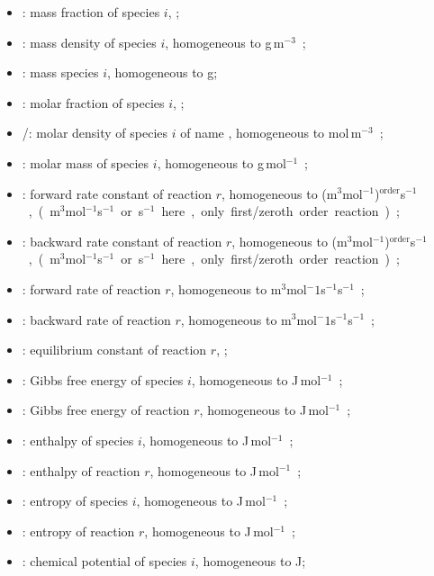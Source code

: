 \begin{itemize}
\item \massfrac[i]:       mass fraction of species $i$, \nounit;
\item \mass[i]:           mass density of species $i$, homogeneous to \unit{g\,m$^{-3}$};
\item \Mass[i]:           mass species $i$, homogeneous to \unit{g};
\item \molarfrac[i]:      molar fraction of species $i$, \nounit;
\item \molar[i]/\conc[I]: molar density of species $i$ of name , homogeneous to \unit{mol\,m$^{-3}$};
\item \Mm[i]:             molar mass of species $i$, homogeneous to \unit{g\,mol$^{-1}$};
\item \fwdratecons[r]:    forward rate constant of reaction $r$, homogeneous to \unit{(m$^3$mol$^{-1}$)$^{\text{order}}$s$^{-1}$},
                            (\unit{m$^3$mol$^{-1}$s$^{-1}$} or \unit{s$^{-1}$} here, only first/zeroth order reaction);
\item \bkwdratecons[r]:   backward rate constant of reaction $r$, homogeneous to \unit{(m$^3$mol$^{-1}$)$^{\text{order}}$s$^{-1}$},
                            (\unit{m$^3$mol$^{-1}$s$^{-1}$} or \unit{s$^{-1}$} here, only first/zeroth order reaction);
\item \fwdrate[r]:        forward rate of reaction $r$, homogeneous to \unit{m$^3$mol${^-1}$s$^{-1}$s$^{-1}$}; 
\item \bkwdrate[r]:       backward rate of reaction $r$, homogeneous to \unit{m$^3$mol${^-1}$s$^{-1}$s$^{-1}$}; 
\item \Eqconst[r]:        equilibrium constant of reaction $r$, \nounit;
\item \gibbs[i]:          Gibbs free energy of species $i$, homogeneous to \unit{J\,mol$^{-1}$};
\item \DGibbs[r]:         Gibbs free energy of reaction $r$, homogeneous to \unit{J\,mol$^{-1}$};
\item \enth[i]:           enthalpy of species $i$, homogeneous to \unit{J\,mol$^{-1}$};
\item \Denth[r]:          enthalpy of reaction $r$, homogeneous to \unit{J\,mol$^{-1}$};
\item \entr[i]:           entropy of species $i$, homogeneous to \unit{J\,mol$^{-1}$};
\item \Dentr[r]:          entropy of reaction $r$, homogeneous to \unit{J\,mol$^{-1}$};
\item \chempot[i]:        chemical potential of species $i$, homogeneous to \unit{J};

\end{itemize}
